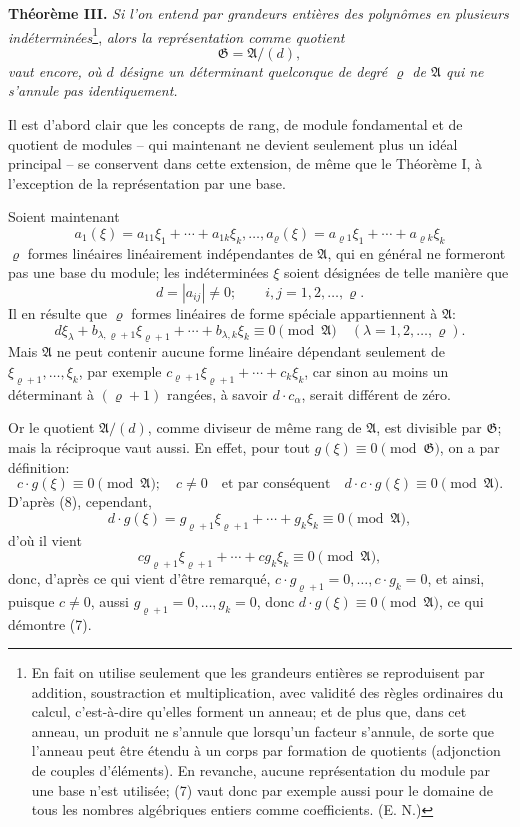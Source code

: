 \documentclass[11pt]{article}
\providecommand{\Amod}{\mathfrak A}
\providecommand{\Gmod}{\mathfrak G}
\providecommand{\zero}[1]{\equiv 0\pmod{#1}}
\begin{document}
\medskip
\noindent\textbf{Théorème III.} \emph{Si l'on entend par grandeurs entières des polynômes en plusieurs indéterminées}\footnote{En fait on utilise seulement que les grandeurs entières se reproduisent par addition, soustraction et multiplication, avec validité des règles ordinaires du calcul, c'est-à-dire qu'elles forment un anneau; et de plus que, dans cet anneau, un produit ne s'annule que lorsqu'un facteur s'annule, de sorte que l'anneau peut être étendu à un corps par formation de quotients (adjonction de couples d'éléments). En revanche, aucune représentation du module par une base n'est utilisée; (7) vaut donc par exemple aussi pour le domaine de tous les nombres algébriques entiers comme coefficients. (E. N.)}, \emph{alors la représentation comme quotient}
\begin{equation}
 \Gmod=\Amod/(d),
\tag{7}
\end{equation}
\emph{vaut encore, où $d$ désigne un déterminant quelconque de degré $\varrho$ de $\Amod$ qui ne s'annule pas identiquement.}

Il est d'abord clair que les concepts de rang, de module fondamental et de quotient de modules -- qui maintenant ne devient seulement plus un idéal principal -- se conservent dans cette extension, de même que le Théorème I, à l'exception de la représentation par une base.

Soient maintenant
\[
 a_1(\xi)=a_{11}\xi_1+\cdots+a_{1k}\xi_k,\ldots,
 a_\varrho(\xi)=a_{\varrho1}\xi_1+\cdots+a_{\varrho k}\xi_k
\]
$\varrho$ formes linéaires linéairement indépendantes de $\Amod$, qui en général ne formeront pas une base du module; les indéterminées $\xi$ soient désignées de telle manière que
\[
 d=|a_{ij}|\ne0;\qquad i,j=1,2,\ldots,\varrho.
\]
Il en résulte que $\varrho$ formes linéaires de forme spéciale appartiennent à $\Amod$:
\begin{equation}
 d\xi_\lambda+b_{\lambda,\varrho+1}\xi_{\varrho+1}+\cdots+b_{\lambda,k}\xi_k\zero{\Amod}
 \quad(\lambda=1,2,\ldots,\varrho).
\tag{8}
\end{equation}
Mais $\Amod$ ne peut contenir aucune forme linéaire dépendant seulement de $\xi_{\varrho+1},\ldots,\xi_k$, par exemple $c_{\varrho+1}\xi_{\varrho+1}+\cdots+c_k\xi_k$, car sinon au moins un déterminant à $(\varrho+1)$ rangées, à savoir $d\cdot c_\alpha$, serait différent de zéro.

Or le quotient $\Amod/(d)$, comme diviseur de même rang de $\Amod$, est divisible par $\Gmod$; mais la réciproque vaut aussi. En effet, pour tout $g(\xi)\zero{\Gmod}$, on a par définition:
\[
 c\cdot g(\xi)\zero{\Amod};\quad c\ne0
 \quad\text{et par conséquent}\quad d\cdot c\cdot g(\xi)\zero{\Amod}.
\]
D'après (8), cependant,
\[
 d\cdot g(\xi)=g_{\varrho+1}\xi_{\varrho+1}+\cdots+g_k\xi_k\zero{\Amod},
\]
d'où il vient
\[
 c g_{\varrho+1}\xi_{\varrho+1}+\cdots+c g_k\xi_k\zero{\Amod},
\]
donc, d'après ce qui vient d'être remarqué, $c\cdot g_{\varrho+1}=0,\ldots,c\cdot g_k=0$, et ainsi, puisque $c\ne0$, aussi $g_{\varrho+1}=0,\ldots,g_k=0$, donc $d\cdot g(\xi)\zero{\Amod}$, ce qui démontre (7).
\end{document}

